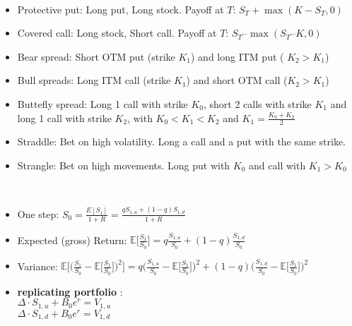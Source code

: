 \documentclass[10pt,landscape,a4paper]{article}
\begin{document}
\begin{multicols*}{3}
  
 \begin{description}[topsep=0pt]
 	\item[Option Strategies] ~
 	\begin{itemize}[topsep=0pt]
 		\item Protective put:  Long put, Long stock. Payoff at  $T$: $ S_T + \operatorname{max}(K-S_T , 0) $
 		\item Covered call: Long stock, Short call.  Payoff at $T$: $ S_T – \operatorname{max}(S_T – K, 0) $
 		\item Bear spread: Short OTM put (strike $K_1$) and long ITM put ( $K_2 > K_1$)
 		\item Bull spreads: Long ITM call (strike $K_1$) and short OTM call ($ K_2 > K_1$)
 		\item Buttefly spread: Long 1 call with strike $K_0$, short 2 calls with strike $K_1$ and long 1 call with strike $K_2$, with $K_0<K_1<K_2$ and $K_1=\frac{K_0+K_2}{2}$
 		\item Straddle: Bet on high volatility. Long a call and a put with the same strike.
 		\item Strangle: Bet on high movements. Long put with $K_0$ and call with $K_1>K_0$ 
 		
 		
 	\end{itemize}
 \end{description}
 
 
  \begin{description}[topsep=0pt]
 	\item[Binomial trees] ~
 	\begin{itemize}[topsep=0pt]
 		\item One step: $S_0=\frac{E[S_1]}{1+R} = \frac{q S_{1,u}+(1-q)S_{1,d}}{1+R}$
 		\item Expected (gross) Return: $\mathbb{E}\Big[\frac{S_1}{S_0}\Big]=q \frac{S_{1,u}}{S_0}+(1-q)\frac{S_{1,d}}{S_0}$
 		\item Variance: $\mathbb{E}\Big[ \Big(\frac{S_1}{S_0} - \mathbb{E}\big[\frac{S_1}{S_0}\big] \Big)^2\Big]=q \Big(\frac{S_{1,u}}{S_0} -\mathbb{E}\big[\frac{S_1}{S_0}\big]\Big)^2+(1-q) \Big(\frac{S_{1,d}}{S_0}-\mathbb{E}\big[\frac{S_1}{S_0}\big]\Big)^2$
 		\item \textbf{replicating portfolio} :\\
 		$\Delta \cdot  S_{1,u} + B_0 e^r = V_{1,u}$ \\
 		$\Delta \cdot  S_{1,d} + B_0 e^r = V_{1,d}$
 		

\end{itemize}
\end{description}
\end{multicols*}
\end{document}
